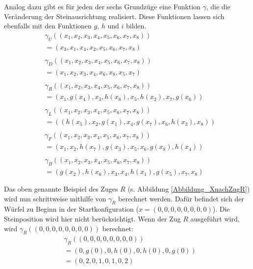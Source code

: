 \documentclass[12pt,a4paper, usenames, dvipsnames]{article}
\theoremstyle{mystyle}
\theoremstyle{definition}
\begin{document}
Analog dazu gibt es für jeden der sechs Grundzüge eine Funktion $\gamma$, die die Veränderung der Steinausrichtung realisiert. Diese Funktionen lassen sich ebenfalls mit den Funktionen $g$, $h$ und $i$ bilden.
\begin{align*}
& \gamma_U \left( (x_1, x_2, x_3, x_4, x_5, x_6, x_7, x_8  ) \right) \\ 
& =  \left( x_3, x_1, x_4, x_2, x_5, x_6, x_7, x_8 \right) \\
\\ 
& \gamma_D \left( (x_1, x_2, x_3, x_4, x_5, x_6, x_7, x_8  ) \right) \\ 
& =  \left( x_1, x_2, x_3, x_4, x_6, x_8, x_5, x_7 \right) \\
\\
& \gamma_R \left( (x_1, x_2, x_3, x_4, x_5, x_6, x_7, x_8  ) \right) \\ 
& =  \left( x_1, g(x_4), x_3, h(x_8), x_5, h(x_2), x_7, g(x_6) \right) \\ 
\\
& \gamma_L \left( (x_1, x_2, x_3, x_4, x_5, x_6, x_7, x_8  ) \right) \\ 
& =  \left( (h(x_5), x_2, g(x_1), x_4, g(x_7), x_6, h(x_3), x_8) \right) \\ 
\\
& \gamma_F \left( (x_1, x_2, x_3, x_4, x_5, x_6, x_7, x_8  ) \right) \\ 
& =  \left( x_1, x_2, h(x_7), g(x_3), x_5, x_6, g(x_8), h(x_4) \right) \\
\\
& \gamma_B \left( (x_1, x_2, x_3, x_4, x_5, x_6, x_7, x_8  ) \right) \\ 
& =  \left( g(x_2), h(x_6), x_3, x_4, h(x_1), g(x_5), x_7, x_8 \right)
\end{align*}

Das oben genannte Beispiel des Zuges $R$ (s. Abbildung \ref{Abbildung_XnachZugR}) wird nun schrittweise mithilfe von $\gamma_R$ berechnet werden. Dafür befindet sich der Würfel zu Beginn in der Startkonfiguration ($x = (0, 0, 0, 0, 0, 0, 0, 0)$). Die Steinposition wird hier nicht berücksichtigt. Wenn der Zug $R$ ausgeführt wird, wird $\gamma_R( (0, 0, 0, 0, 0, 0, 0, 0) )$ berechnet:
\begin{align*}
& \gamma_R( (0, 0, 0, 0, 0, 0, 0, 0) ) \\
& = (0, g(0), 0, h(0), 0, h(0), 0, g(0)) \\
& = (0, 2, 0, 1, 0, 1, 0, 2)
\end{align*}
\end{document}
